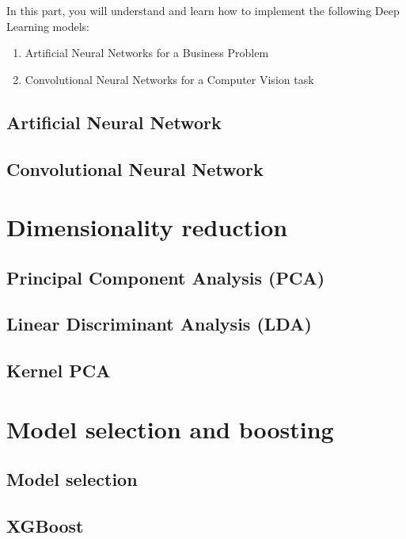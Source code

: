 \documentclass[runningheads,a4paper]{llncs}
\begin{document}
In this part, you will understand and learn how to implement the following Deep Learning models:
\begin{enumerate}
\item Artificial Neural Networks for a Business Problem
\item Convolutional Neural Networks for a Computer Vision task
\end{enumerate}

\subsection{Artificial Neural Network}
\subsection{Convolutional Neural Network}

\newpage

\section{Dimensionality reduction}
\subsection{Principal Component Analysis (PCA)}
\subsection{Linear Discriminant Analysis (LDA)}
\subsection{Kernel PCA}

\newpage

\section{Model selection and boosting}
\subsection{Model selection}
\subsection{XGBoost}


\nocite{*} 
\end{document}
